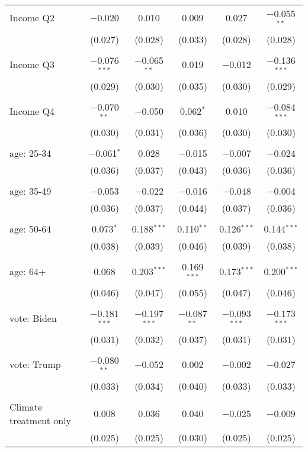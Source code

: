 \begin{tabular}{@{\extracolsep{5pt}}lccccc}
 Income Q2 & $-$0.020 & 0.010 & 0.009 & 0.027 & $-$0.055$^{**}$ \\ 
  & (0.027) & (0.028) & (0.033) & (0.028) & (0.028) \\ 
  & & & & & \\ 
 Income Q3 & $-$0.076$^{***}$ & $-$0.065$^{**}$ & 0.019 & $-$0.012 & $-$0.136$^{***}$ \\ 
  & (0.029) & (0.030) & (0.035) & (0.030) & (0.029) \\ 
  & & & & & \\ 
 Income Q4 & $-$0.070$^{**}$ & $-$0.050 & 0.062$^{*}$ & 0.010 & $-$0.084$^{***}$ \\ 
  & (0.030) & (0.031) & (0.036) & (0.030) & (0.030) \\ 
  & & & & & \\ 
 age: 25-34 & $-$0.061$^{*}$ & 0.028 & $-$0.015 & $-$0.007 & $-$0.024 \\ 
  & (0.036) & (0.037) & (0.043) & (0.036) & (0.036) \\ 
  & & & & & \\ 
 age: 35-49 & $-$0.053 & $-$0.022 & $-$0.016 & $-$0.048 & $-$0.004 \\ 
  & (0.036) & (0.037) & (0.044) & (0.037) & (0.036) \\ 
  & & & & & \\ 
 age: 50-64 & 0.073$^{*}$ & 0.188$^{***}$ & 0.110$^{**}$ & 0.126$^{***}$ & 0.144$^{***}$ \\ 
  & (0.038) & (0.039) & (0.046) & (0.039) & (0.038) \\ 
  & & & & & \\ 
 age: 64+ & 0.068 & 0.203$^{***}$ & 0.169$^{***}$ & 0.173$^{***}$ & 0.200$^{***}$ \\ 
  & (0.046) & (0.047) & (0.055) & (0.047) & (0.046) \\ 
  & & & & & \\ 
 vote: Biden & $-$0.181$^{***}$ & $-$0.197$^{***}$ & $-$0.087$^{**}$ & $-$0.093$^{***}$ & $-$0.173$^{***}$ \\ 
  & (0.031) & (0.032) & (0.037) & (0.031) & (0.031) \\ 
  & & & & & \\ 
 vote: Trump & $-$0.080$^{**}$ & $-$0.052 & 0.002 & $-$0.002 & $-$0.027 \\ 
  & (0.033) & (0.034) & (0.040) & (0.033) & (0.033) \\ 
  & & & & & \\ 
 Climate treatment only & 0.008 & 0.036 & 0.040 & $-$0.025 & $-$0.009 \\ 
  & (0.025) & (0.025) & (0.030) & (0.025) & (0.025) \\ 

\end{tabular}
